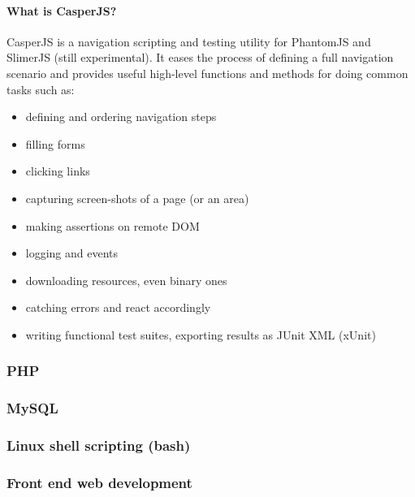 \documentclass{article}
\begin{document}
\paragraph{What is CasperJS?}
CasperJS is a navigation scripting and testing utility for PhantomJS and SlimerJS (still experimental). It eases the process of defining a full navigation scenario and provides useful high-level functions and methods for doing common tasks such as:
\begin{itemize}
	\item defining and ordering navigation steps
	\item filling forms
	\item clicking links
	\item capturing screen-shots of a page (or an area)
	\item making assertions on remote DOM		
	\item logging and events
	\item downloading resources, even binary ones
	\item catching errors and react accordingly
	\item writing functional test suites, exporting results as JUnit XML (xUnit)
\end{itemize}
\begin{center}
								
\end{center}
	
\subsubsection{PHP}
\subsubsection{MySQL}
\subsubsection{Linux shell scripting (bash)}
\subsubsection{Front end web development}
	
	
\end{document}
